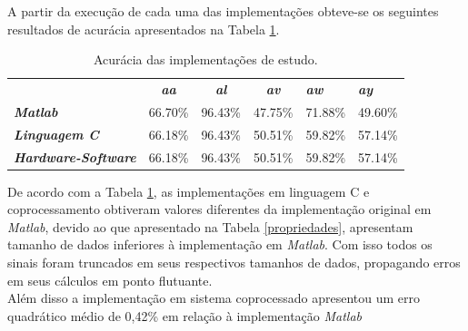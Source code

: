 A partir da execução de cada uma das implementações obteve-se os seguintes resultados de acurácia apresentados na Tabela \ref{acuracias}. 
\begin{table}[!h]
	\centering
	\caption{Acurácia das implementações de estudo.}
	\label{acuracias}
	\begin{tabular}{lccccc}
		\rowcolor[HTML]{DAE8FC} 
		\multicolumn{1}{c}{\cellcolor[HTML]{DAE8FC}\textbf{Implementação}} & \textit{\textbf{aa}} & \textit{\textbf{al}} & \textit{\textbf{av}} & \multicolumn{1}{l}{\cellcolor[HTML]{DAE8FC}\textit{\textbf{aw}}} & \multicolumn{1}{l}{\cellcolor[HTML]{DAE8FC}\textit{\textbf{ay}}} \\
		\textit{\textbf{Matlab}}                                        & 66.70\%              & 96.43\%              & 47.75\%              & 71.88\%                                                          & 49.60\%                                                          \\
		\rowcolor[HTML]{DAE8FC} 
		\textit{\textbf{Linguagem C}}                                   & 66.18\%              & 96.43\%              & 50.51\%              & 59.82\%                                                          & 57.14\%                                                             \\
		\textit{\textbf{Hardware-Software}}                             & 66.18\%              & 96.43\%              & 50.51\%              & 59.82\%                                                          & 57.14\%                                                         
	\end{tabular}
\end{table}

De acordo com a Tabela \ref{acuracias}, as implementações em linguagem C e coprocessamento obtiveram valores diferentes da implementação original em \textit{Matlab}, devido ao que apresentado na Tabela \ref{propriedades}, apresentam tamanho de dados inferiores à implementação em \textit{Matlab}. Com isso todos os sinais foram truncados em seus respectivos tamanhos de dados, propagando erros em seus cálculos em ponto flutuante.\\
Além disso a implementação em sistema coprocessado apresentou um erro quadrático médio de 0,42\% em relação à implementação \textit{Matlab}

